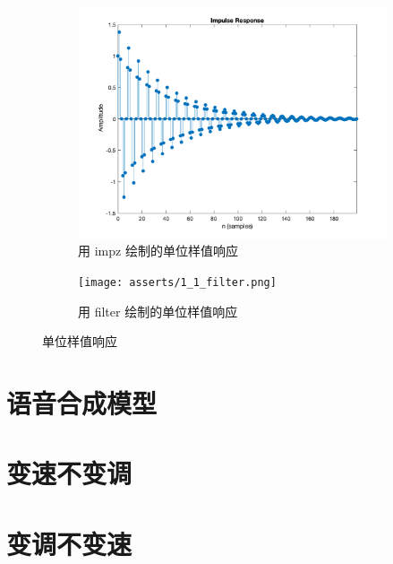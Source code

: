 \documentclass[a4paper]{article}  %
\begin{document}
\begin{figure}[ht]
    \begin{subfigure}[b]{0.48\textwidth}
        \centering
        \includegraphics[width=\textwidth]{asserts/1_1_impz.png}
        \caption{
            用 impz 绘制的单位样值响应
        }\label{fig:impz}
    \end{subfigure}
    \hfill
    \begin{subfigure}[b]{0.48\textwidth}
        \centering
        \texttt{[image: asserts/1\_1\_filter.png]}
        \caption{
            用 filter 绘制的单位样值响应
        }\label{fig:filter}
    \end{subfigure}
    \caption{
        单位样值响应
    }
\end{figure}

\section{语音合成模型}
\section{变速不变调}
\section{变调不变速}


\end{document}

